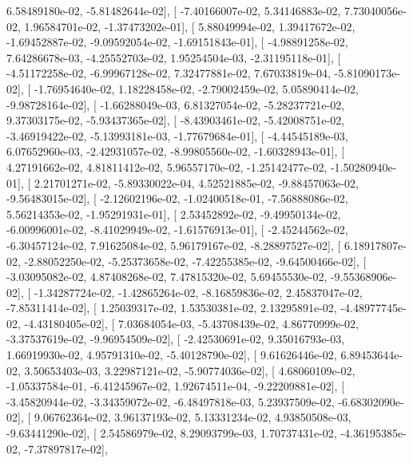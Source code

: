 \documentclass{article}
\begin{document}
          6.58489180e-02,  -5.81482644e-02],
       [ -7.40166007e-02,   5.34146883e-02,   7.73040056e-02,
          1.96584701e-02,  -1.37473202e-01],
       [  5.88049994e-02,   1.39417672e-02,  -1.69452887e-02,
         -9.09592054e-02,  -1.69151843e-01],
       [ -4.98891258e-02,   7.64286678e-03,  -4.25552703e-02,
          1.95254504e-03,  -2.31195118e-01],
       [ -4.51172258e-02,  -6.99967128e-02,   7.32477881e-02,
          7.67033819e-04,  -5.81090173e-02],
       [ -1.76954640e-02,   1.18228458e-02,  -2.79002459e-02,
          5.05890414e-02,  -9.98728164e-02],
       [ -1.66288049e-03,   6.81327054e-02,  -5.28237721e-02,
          9.37303175e-02,  -5.93437365e-02],
       [ -8.43903461e-02,  -5.42008751e-02,  -3.46919422e-02,
         -5.13993181e-03,  -1.77679684e-01],
       [ -4.44545189e-03,   6.07652960e-03,  -2.42931057e-02,
         -8.99805560e-02,  -1.60328943e-01],
       [  4.27191662e-02,   4.81811412e-02,   5.96557170e-02,
         -1.25142477e-02,  -1.50280940e-01],
       [  2.21701271e-02,  -5.89330022e-04,   4.52521885e-02,
         -9.88457063e-02,  -9.56483015e-02],
       [ -2.12602196e-02,  -1.02400518e-01,  -7.56888086e-02,
          5.56214353e-02,  -1.95291931e-01],
       [  2.53452892e-02,  -9.49950134e-02,  -6.00996001e-02,
         -8.41029949e-02,  -1.61576913e-01],
       [ -2.45244562e-02,  -6.30457124e-02,   7.91625084e-02,
          5.96179167e-02,  -8.28897527e-02],
       [  6.18917807e-02,  -2.88052250e-02,  -5.25373658e-02,
         -7.42255385e-02,  -9.64500466e-02],
       [ -3.03095082e-02,   4.87408268e-02,   7.47815320e-02,
          5.69455530e-02,  -9.55368906e-02],
       [ -1.34287724e-02,  -1.42865264e-02,  -8.16859836e-02,
          2.45837047e-02,  -7.85311414e-02],
       [  1.25039317e-02,   1.53530381e-02,   2.13295891e-02,
         -4.48977745e-02,  -4.43180405e-02],
       [  7.03684054e-03,  -5.43708439e-02,   4.86770999e-02,
         -3.37537619e-02,  -9.96954509e-02],
       [ -2.42530691e-02,   9.35016793e-03,   1.66919930e-02,
          4.95791310e-02,  -5.40128790e-02],
       [  9.61626446e-02,   6.89453644e-02,   3.50653403e-03,
          3.22987121e-02,  -5.90774036e-02],
       [  4.68060109e-02,  -1.05337584e-01,  -6.41245967e-02,
          1.92674511e-04,  -9.22209881e-02],
       [ -3.45820944e-02,  -3.34359072e-02,  -6.48497818e-03,
          5.23937509e-02,  -6.68302090e-02],
       [  9.06762364e-02,   3.96137193e-02,   5.13331234e-02,
          4.93850508e-03,  -9.63441290e-02],
       [  2.54586979e-02,   8.29093799e-03,   1.70737431e-02,
         -4.36195385e-02,  -7.37897817e-02],
\end{document}
